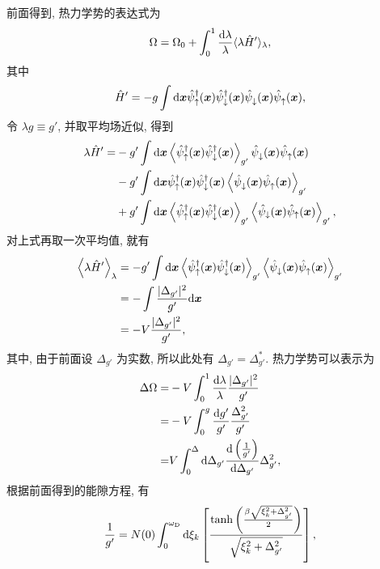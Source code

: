 前面得到, 热力学势的表达式为
\begin{equation}
    \Omega =\Omega_0+\int_0^1\frac{\mathrm{d}\lambda}{\lambda}\langle \lambda \hat{H}' \rangle_{\lambda},
\end{equation}
其中 
\begin{equation}
    \hat{H}'=-g\int\mathrm{d}\boldsymbol{x}\hat{\psi}^\dagger_\uparrow (\boldsymbol{x})\hat{\psi}^\dagger_{\downarrow}(\boldsymbol{x})\hat{\psi}^{ }_{\downarrow}(\boldsymbol{x})\hat{\psi}^{ }_{\uparrow}(\boldsymbol{x}),
\end{equation}
令 $\lambda g\equiv g'$, 并取平均场近似, 得到 
 \begin{align}
        \lambda \hat{H}'=&-g'\int\mathrm{d}\boldsymbol{x}\left\langle \hat{\psi}_{\uparrow}^\dagger (\boldsymbol{x})\hat{\psi}_{\downarrow}^\dagger (\boldsymbol{x}) \right\rangle_{g'} \hat{\psi}_{\downarrow}^{ }(\boldsymbol{x})\hat{\psi}_{\uparrow}^{ }(\boldsymbol{x})\nonumber\\
        &-g'\int\mathrm{d}\boldsymbol{x}\hat{\psi}_{\uparrow}^\dagger (\boldsymbol{x})\hat{\psi}_{\downarrow}^\dagger (\boldsymbol{x})\left\langle \hat{\psi}_{\downarrow}^{ }(\boldsymbol{x})\hat{\psi}_{\uparrow}^{ }(\boldsymbol{x}) \right\rangle_{g'}\nonumber\\
        &+g'\int\mathrm{d}\boldsymbol{x}\left\langle \hat{\psi}_{\uparrow}^\dagger(\boldsymbol{x}) \hat{\psi}_{\downarrow}^{\dagger}(\boldsymbol{x}) \right\rangle_{g'}\left\langle \hat{\psi}_\downarrow(\boldsymbol{x})\hat{\psi}_{\uparrow}(\boldsymbol{x})  \right\rangle_{g'},
    \end{align}
对上式再取一次平均值, 就有 
 \begin{align}
        \left\langle \lambda \hat{H}' \right\rangle_{\lambda} &=-g'\int\mathrm{d}\boldsymbol{x}\left\langle \hat{\psi}_\uparrow^\dagger(\boldsymbol{x})\hat{\psi}_\downarrow^\dagger(\boldsymbol{x}) \right\rangle_{g'} \left\langle \hat{\psi}_\downarrow^{ }(\boldsymbol{x})\hat{\psi}_{\uparrow}^{ }(\boldsymbol{x}) \right\rangle_{g'}\nonumber\\
        &=-\int\frac{|\Delta_{g'}|^2}{g'}\mathrm{d}\boldsymbol{x}\nonumber\\
        &=-V\frac{|\Delta_{g'}|^2}{g'},
    \end{align}
其中, 由于前面设 $\Delta_{g'}$ 为实数, 所以此处有 $\Delta_{g'}=\Delta^*_{g'}$. 热力学势可以表示为 
  \begin{align}
        \Delta\Omega=&-V\int_0^1\frac{\mathrm{d}\lambda}{\lambda}\frac{|\Delta_{g'}|^2}{g'}\nonumber\\
        =&-V\int_0^g\frac{\mathrm{d} g'}{g'}\frac{\Delta^2_{g'}}{g'}\nonumber\\
        =&V\int_0^\Delta \mathrm{d}\Delta_{g'}\frac{\mathrm{d}\left( \frac{1}{g'} \right)}{\mathrm{d}\Delta_{g'}}\Delta^2_{g'},
    \end{align}
根据前面得到的能隙方程, 有 
\begin{equation}
    \frac{1}{g'}=N(0)\int_0^{\omega_{\mathrm{D}}}\mathrm{d}\xi_k\left[ \frac{\tanh \left( \frac{\beta\sqrt{\xi_k^2+\Delta_{g'}^2}}{2} \right) }{\sqrt{\xi_k^2+\Delta_{g'}^2}} \right],
\end{equation}
